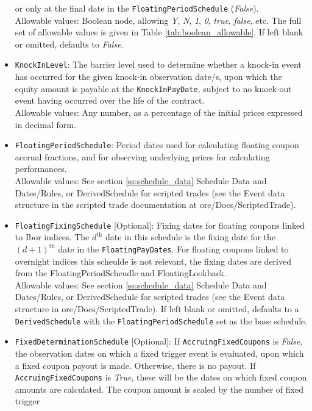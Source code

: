 \begin{itemize}
  or only at the final date in the \lstinline!FloatingPeriodSchedule! (\emph{False}). \\
    Allowable values: Boolean node, allowing \emph{Y}, \emph{N}, \emph{1}, \emph{0},
    \emph{true}, \emph{false}, etc. The full set of allowable values is given in Table
    \ref{tab:boolean_allowable}. If left blank or omitted, defaults to \emph{False}.
  \item \lstinline!KnockInLevel!: The barrier level used to determine whether
  a knock-in event has occurred for the given knock-in observation date/s, upon which the
  equity amount is payable at the \lstinline!KnockInPayDate!, subject to no knock-out event
  having occurred over the life of the contract. \\
  Allowable values: Any number, as a percentage of the initial prices expressed in decimal
  form.
  \item \lstinline!FloatingPeriodSchedule!: Period dates used for calculating floating coupon
  accrual fractions, and for observing underlying prices for calculating performances. \\
    Allowable values: See section \ref{ss:schedule_data} Schedule Data and Dates/Rules, or
    DerivedSchedule for scripted trades (see the Event data structure in the scripted trade documentation at ore/Docs/ScriptedTrade).
  \item \lstinline!FloatingFixingSchedule! [Optional]: Fixing dates for floating coupons linked
    to Ibor indices. The $d^\text{th}$ date in this schedule is the fixing date for the $(d+1)^\text{th}$
    date in the \lstinline!FloatingPayDates!. For floating coupons linked to overnight indices
    this scheulde is not relevant, the fixing dates are derived from the FloatingPeriodScheudle
    and FloatingLookback. \\
    Allowable values: See section \ref{ss:schedule_data} Schedule Data and Dates/Rules, or
    DerivedSchedule for scripted trades (see the Event data structure in ore/Docs/ScriptedTrade).
    If left blank or omitted, defaults to a \lstinline!DerivedSchedule! with the
    \lstinline!FloatingPeriodSchedule! set as the base schedule.
  \item \lstinline!FixedDeterminationSchedule! [Optional]: If \lstinline!AccruingFixedCoupons!
  is \emph{False}, the observation dates on which a fixed trigger event is evaluated, upon
  which a fixed coupon payout is made. Otherwise, there is no payout. If
  \lstinline!AccruingFixedCoupons! is \emph{True}, these will be the dates on which fixed
  coupon amounts are calculated. The coupon amount is scaled by the number of fixed trigger

\end{itemize}
